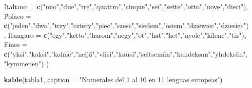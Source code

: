 \documentclass[
]{book}
\newenvironment{Shaded}{\begin{snugshade}}{\end{snugshade}}
\newcommand{\AttributeTok}[1]{\textcolor[rgb]{0.13,0.29,0.53}{#1}}
\newcommand{\FunctionTok}[1]{\textcolor[rgb]{0.13,0.29,0.53}{\textbf{#1}}}
\newcommand{\NormalTok}[1]{#1}
\newcommand{\StringTok}[1]{\textcolor[rgb]{0.31,0.60,0.02}{#1}}
\begin{document}
\begin{Shaded}
\begin{Highlighting}[]
  \AttributeTok{Italiano =} \FunctionTok{c}\NormalTok{(}\StringTok{"uno"}\NormalTok{,}\StringTok{"due"}\NormalTok{,}\StringTok{"tre"}\NormalTok{,}\StringTok{"quattro"}\NormalTok{,}\StringTok{"cinque"}\NormalTok{,}\StringTok{"sei"}\NormalTok{,}\StringTok{"sette"}\NormalTok{,}\StringTok{"otto"}\NormalTok{,}\StringTok{"nove"}\NormalTok{,}\StringTok{"dieci"}\NormalTok{),}
  \AttributeTok{Polaco =} \FunctionTok{c}\NormalTok{(}\StringTok{"jeden"}\NormalTok{,}\StringTok{"dwa"}\NormalTok{,}\StringTok{"trzy"}\NormalTok{,}\StringTok{"cztery"}\NormalTok{,}\StringTok{"piec"}\NormalTok{,}\StringTok{"szesc"}\NormalTok{,}\StringTok{"siedem"}\NormalTok{,}\StringTok{"osiem"}\NormalTok{,}\StringTok{"dziewiec"}\NormalTok{,}\StringTok{"dziesiec"}\NormalTok{),}
  \AttributeTok{Hungaro =} \FunctionTok{c}\NormalTok{(}\StringTok{"egy"}\NormalTok{,}\StringTok{"ketto"}\NormalTok{,}\StringTok{"harom"}\NormalTok{,}\StringTok{"negy"}\NormalTok{,}\StringTok{"ot"}\NormalTok{,}\StringTok{"hat"}\NormalTok{,}\StringTok{"het"}\NormalTok{,}\StringTok{"nyolc"}\NormalTok{,}\StringTok{"kilenc"}\NormalTok{,}\StringTok{"tiz"}\NormalTok{),}
  \AttributeTok{Fines =} \FunctionTok{c}\NormalTok{(}\StringTok{"yksi"}\NormalTok{,}\StringTok{"kaksi"}\NormalTok{,}\StringTok{"kolme"}\NormalTok{,}\StringTok{"neljä"}\NormalTok{,}\StringTok{"viisi"}\NormalTok{,}\StringTok{"kuusi"}\NormalTok{,}\StringTok{"seitsemän"}\NormalTok{,}\StringTok{"kahdeksan"}\NormalTok{,}\StringTok{"yhdeksän"}\NormalTok{,}\StringTok{"kymmenen"}\NormalTok{)}
\NormalTok{)}

\FunctionTok{kable}\NormalTok{(tabla1, }\AttributeTok{caption =} \StringTok{"Numerales del 1 al 10 en 11 lenguas europeas"}\NormalTok{)}
\end{Highlighting}
\end{Shaded}
\end{document}
